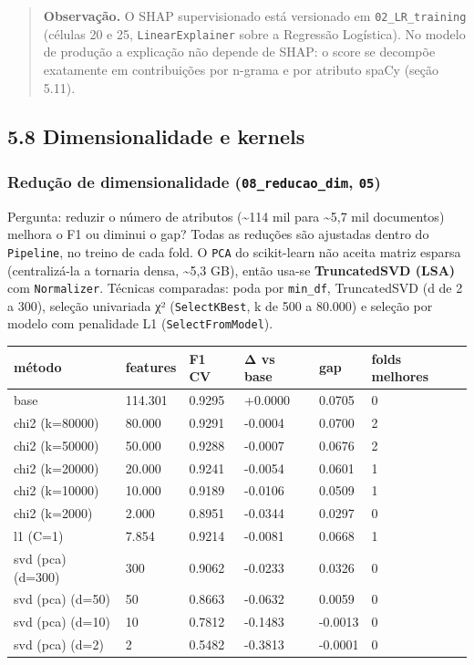 \documentclass[
  brazilian,
  11pt,
]{article}
\newcounter{none} %
\begin{document}
\begin{quote}
\textbf{Observação.} O SHAP supervisionado está versionado em \texttt{02\_LR\_training} (células 20 e 25, \texttt{LinearExplainer} sobre a Regressão Logística). No modelo de produção a explicação não depende de SHAP: o score se decompõe exatamente em contribuições por n-grama e por atributo spaCy (seção 5.11).
\end{quote}

\subsection{5.8 Dimensionalidade e kernels}\label{dimensionalidade-e-kernels}

\subsubsection{\texorpdfstring{Redução de dimensionalidade (\texttt{08\_reducao\_dim}, \texttt{05})}{Redução de dimensionalidade (08\_reducao\_dim, 05)}}\label{reduuxe7uxe3o-de-dimensionalidade-08_reducao_dim-05}

Pergunta: reduzir o número de atributos (\textasciitilde114 mil para \textasciitilde5,7 mil documentos) melhora o F1 ou diminui o gap? Todas as reduções são ajustadas dentro do \texttt{Pipeline}, no treino de cada fold. O \texttt{PCA} do scikit-learn não aceita matriz esparsa (centralizá-la a tornaria densa, \textasciitilde5,3 GB), então usa-se \textbf{TruncatedSVD (LSA)} com \texttt{Normalizer}. Técnicas comparadas: poda por \texttt{min\_df}, TruncatedSVD (d de 2 a 300), seleção univariada χ² (\texttt{SelectKBest}, k de 500 a 80.000) e seleção por modelo com penalidade L1 (\texttt{SelectFromModel}).

{\def\LTcaptype{none} %
\begin{longtable}[]{@{}llllll@{}}
\toprule\noalign{}
método & features & F1 CV & Δ vs base & gap & folds melhores \\
\midrule\noalign{}
\endhead
\bottomrule\noalign{}
\endlastfoot
base & 114.301 & 0.9295 & +0.0000 & 0.0705 & 0 \\
chi2 (k=80000) & 80.000 & 0.9291 & -0.0004 & 0.0700 & 2 \\
chi2 (k=50000) & 50.000 & 0.9288 & -0.0007 & 0.0676 & 2 \\
chi2 (k=20000) & 20.000 & 0.9241 & -0.0054 & 0.0601 & 1 \\
chi2 (k=10000) & 10.000 & 0.9189 & -0.0106 & 0.0509 & 1 \\
chi2 (k=2000) & 2.000 & 0.8951 & -0.0344 & 0.0297 & 0 \\
l1 (C=1) & 7.854 & 0.9214 & -0.0081 & 0.0668 & 1 \\
svd (pca) (d=300) & 300 & 0.9062 & -0.0233 & 0.0326 & 0 \\
svd (pca) (d=50) & 50 & 0.8663 & -0.0632 & 0.0059 & 0 \\
svd (pca) (d=10) & 10 & 0.7812 & -0.1483 & -0.0013 & 0 \\
svd (pca) (d=2) & 2 & 0.5482 & -0.3813 & -0.0001 & 0 \\
\end{longtable}
}
\end{document}
